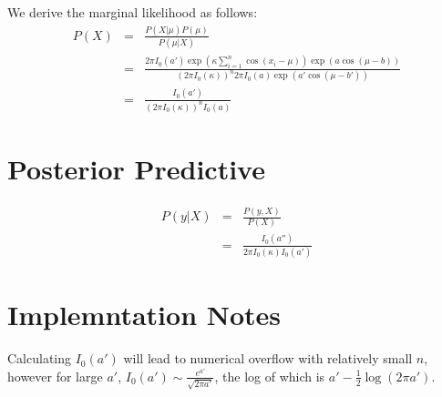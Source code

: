 \documentclass[letterpaper,11pt]{article}
\begin{document}
	We derive the marginal likelihood as follows:
	\begin{eqnarray}
		P(X) & = & \frac{P(X|\mu)P(\mu)}{P(\mu|X)}\\
		& = & \frac{2\pi I_0(a') \exp\left( \kappa \sum_{i=1}^n \cos(x_i-\mu)\right) \exp\left( a \cos(\mu-b)\right)}{ \left(2\pi I_0(\kappa)\right)^n 2\pi I_0(a) \exp\left( a' \cos(\mu-b')\right)} \\
		& = & \frac{I_0(a')}{\left(2\pi I_0(\kappa)\right)^{n}I_0(a)}
	\end{eqnarray}

	\section{Posterior Predictive}

	\begin{eqnarray}
		P(y|X) & = & \frac{P(y,X)}{P(X)}\\
		&=& \frac{I_0(a'')}{2\pi I_0(\kappa) I_0(a')}
	\end{eqnarray}

	\section{Implemntation Notes}

	Calculating $I_0(a')$ will lead to numerical overflow with relatively small $n$, however for large $a'$, $I_0(a') \sim \frac{e^{a'}}{\sqrt{2\pi a'}}$, the log of which is $a' - \frac{1}{2}\log(2\pi a')$.
\end{document}
